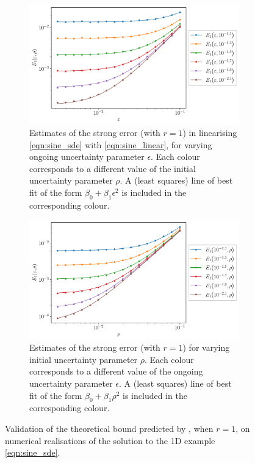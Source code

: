\begin{figure}
	\begin{center}
		\begin{subfigure}{\textwidth}
			\includegraphics[width=\textwidth]{chp04_paper_numerics/figures/sine/str_err_eps_r_1.0_log.pdf}
			\caption{Estimates of the strong error (with \(r = 1\)) in linearising \eqref{eqn:sine_sde} with \eqref{eqn:sine_linear}, for varying ongoing uncertainty parameter \(\epsilon\).
   Each colour corresponds to a different value of the initial uncertainty parameter \(\rho\).
   A (least squares) line of best fit of the form \(\beta_0 + \beta_1 \epsilon^2\) is included in the corresponding colour.}
			\label{fig:sine_eps_lines}
		\end{subfigure}
		\begin{subfigure}{\textwidth}
			\includegraphics[width=\textwidth]{chp04_paper_numerics/figures/sine/str_err_rho_r_1.0_log.pdf}
			\caption{Estimates of the strong error (with \(r = 1\)) for varying initial uncertainty parameter \(\rho\).
			Each colour corresponds to a different value of the ongoing uncertainty parameter \(\epsilon\).
			A (least squares) line of best fit of the form \(\beta_0 + \beta_1 \rho^2\) is included in the corresponding colour.}
			\label{fig:sine_delta_lines}
		\end{subfigure}
		\caption{Validation of the theoretical bound predicted by , when \(r = 1\), on numerical realisations of the solution to the 1D example \eqref{eqn:sine_sde}.}
		\label{fig:sine_delta_eps_lines}
	\end{center}
\end{figure}


